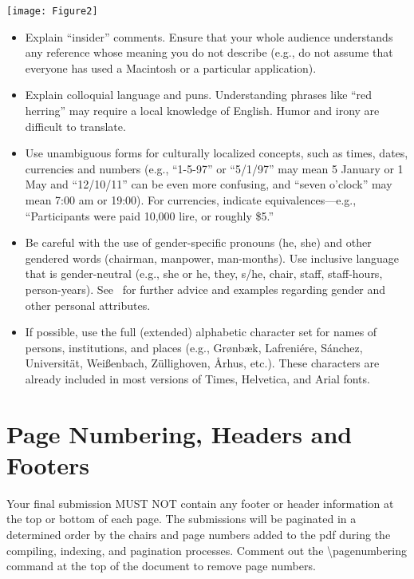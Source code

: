 \documentclass{scsPaperFormattingTemplate-LaTex-Revised20160302}
\begin{document}
\begin{figure*}[t]
	\centering
	\texttt{[image: Figure2]}
	\centering
	\caption{Sample of a wide figure. Be sure to place at the top of the page or bottom of the page.}
	\centering
	\label{fig:figure2}
\end{figure*}

\begin{itemize}
\item Explain ``insider'' comments. Ensure that your whole audience understands any reference whose meaning you do not describe (e.g., do not assume that everyone has used a Macintosh or a particular application).
\item Explain colloquial language and puns. Understanding phrases like ``red herring'' may require a local knowledge of English. Humor and irony are difficult to translate.
\item Use unambiguous forms for culturally localized concepts, such as times, dates, currencies and numbers (e.g., ``1-5-97'' or ``5/1/97'' may mean 5 January or 1 May and ``12/10/11'' can be even more confusing, and ``seven o'clock'' may mean 7:00 am or 19:00).  For currencies, indicate equivalences---e.g., ``Participants were paid 10,000 lire, or roughly \$5.''
\item Be careful with the use of gender-specific pronouns (he, she) and other gendered words (chairman, manpower, man-months). Use inclusive language that is gender-neutral (e.g., she or he, they, s/he, chair, staff, staff-hours, person-years). See~\cite{Schwartz:1995:GBF} for further advice and examples regarding gender and other personal attributes.
\item If possible, use the full (extended) alphabetic character set for names of persons, institutions, and places (e.g., Gr{\o}nb{\ae}k, Lafreni\'ere, S\'anchez, Universit{\"a}t, Wei{\ss}enbach, Z{\"u}llighoven, \r{A}rhus, etc.).  These characters are already included in most versions of Times, Helvetica, and Arial fonts.
\end{itemize}

\section{Page Numbering, Headers and Footers}

Your final submission MUST NOT contain any footer or header information at the top or bottom of each page. The submissions will be paginated in a determined order by the chairs and page numbers added to the pdf during the compiling, indexing, and pagination processes. Comment out the {\textbackslash}pagenumbering command at the top of the document to remove page numbers.
\end{document}
